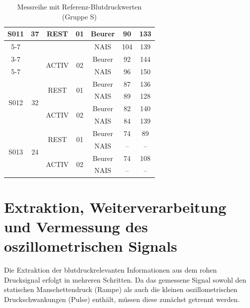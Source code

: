 \documentclass[a4paper, 11pt]{scrartcl}
\begin{document}
\begin{table}[H]
{\begin{tabular}{|c|c|c|c|c|c|c|}
\multirow{4}{*}{S011} & \multirow{4}{*}{37} & \multirow{2}{*}{REST} & \multirow{2}{*}{01} & Beurer & 90 & 133 \\ \cline{5-7}
& & & & NAIS & 104 & 139 \\ \cline{3-7}
& & \multirow{2}{*}{ACTIV} & \multirow{2}{*}{02} & Beurer & 92 & 144 \\ \cline{5-7}
& & & & NAIS & 96 & 150 \\ \hline

\multirow{4}{*}{S012} & \multirow{4}{*}{32} & \multirow{2}{*}{REST} & \multirow{2}{*}{01} & Beurer & 87 & 136 \\ \cline{5-7}
& & & & NAIS & 89 & 128 \\ \cline{3-7}
& & \multirow{2}{*}{ACTIV} & \multirow{2}{*}{02} & Beurer & 82 & 140 \\ \cline{5-7}
& & & & NAIS & 84 & 139 \\ \hline

\multirow{4}{*}{S013} & \multirow{4}{*}{24} & \multirow{2}{*}{REST} & \multirow{2}{*}{01} & Beurer & 74 & 89 \\ \cline{5-7}
& & & & NAIS & -- & -- \\ \cline{3-7}
& & \multirow{2}{*}{ACTIV} & \multirow{2}{*}{02} & Beurer & 74 & 108 \\ \cline{5-7}
& & & & NAIS & -- & -- \\ \hline
\end{tabular}
}
\caption{Messreihe mit Referenz-Blutdruckwerten (Gruppe S)}
\label{tab:Messreihe_S}
\end{table}
\newpage

\section{Extraktion, Weiterverarbeitung und Vermessung des oszillometrischen Signals}

Die Extraktion der blutdruckrelevanten Informationen aus dem rohen Drucksignal erfolgt in mehreren Schritten. Da das gemessene Signal sowohl den statischen Manschettendruck (Rampe) als auch die kleinen oszillometrischen Druckschwankungen (Pulse) enthält, müssen diese zunächst getrennt werden.
\end{document}

